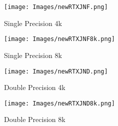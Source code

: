 \begin{figure*}[ht]
\centering
\caption{Comparison of Single and Double Precision GPU Codes on RTX5000 and Jetson Nano}

\begin{subfigure}{0.45\linewidth}
    \centering
    \texttt{[image: Images/newRTXJNF.png]}
    \caption{Single Precision 4k}
    \label{fig:RTXJNfloat4k}
\end{subfigure}
\hfill
\begin{subfigure}{0.45\linewidth}
    \centering
    \texttt{[image: Images/newRTXJNF8k.png]}
    \caption{Single Precision 8k}
    \label{fig:RTXJNfloat8k}
\end{subfigure}

\begin{subfigure}{0.45\linewidth}
    \centering
    \texttt{[image: Images/newRTXJND.png]}
    \caption{Double Precision 4k}
    \label{fig:RTXJNdouble4k}
\end{subfigure}
\hfill
\begin{subfigure}{0.45\linewidth}
    \centering
    \texttt{[image: Images/newRTXJND8k.png]}
    \caption{Double Precision 8k}
    \label{fig:RTXJNdouble8k}
\end{subfigure}
\label{fig:gpu}
\end{figure*}

